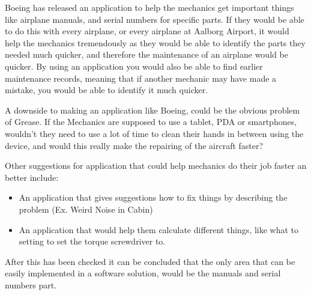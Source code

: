 Boeing has released an application to help the mechanics get important things like airplane manuals, and serial numbers for specific parts. If they would be able to do this with every airplane, or every airplane at Aalborg Airport, it would help the mechanics tremendously as they would be able to identify the parts they needed much quicker, and therefore the maintenance of an airplane would be quicker. By using an application you would also be able to find earlier maintenance records, meaning that if another mechanic may have made a mistake, you would be able to identify it much quicker\cite{cnet_boeing_app}.

A downside to making an application like Boeing, could be the obvious problem of Grease. If the Mechanics are supposed to use a tablet, PDA or smartphones, wouldn't they need to use a lot of time to clean their hands in between using the device, and would this really make the repairing of the aircraft faster?

Other suggestions for application that could help mechanics do their job faster an better include:
\begin{itemize}
\item An application that gives suggestions how to fix things by describing the problem (Ex. Weird Noise in Cabin)
\item An application that would help them calculate different things, like what to setting to set the torque screwdriver to. 
\end{itemize}

After this has been checked it can be concluded that the only area that can be easily implemented in a software solution, would be the manuals and serial numbers part.
